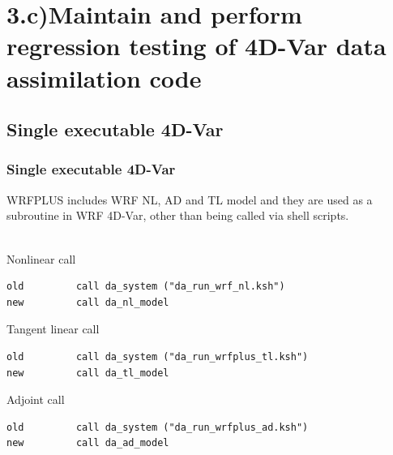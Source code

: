 \documentclass{beamer}
\begin{document}
\section{3.c)Maintain and perform regression testing of 4D-Var data assimilation code}

\subsection{Single executable 4D-Var}
\begin{frame}[fragile]
\frametitle{Single executable 4D-Var}
WRFPLUS includes WRF NL, AD and TL model and they are used as a subroutine in WRF 4D-Var, other than being called via shell scripts.
~\\
~\\
\begin{beamerboxesrounded}[ lower=postit,shadow=true]{Nonlinear call}
\begin{verbatim}
old         call da_system ("da_run_wrf_nl.ksh")
new         call da_nl_model
\end{verbatim}
\end{beamerboxesrounded}
\begin{beamerboxesrounded}[ lower=postit,shadow=true]{Tangent linear call}
\begin{verbatim}
old         call da_system ("da_run_wrfplus_tl.ksh")
new         call da_tl_model
\end{verbatim}
\end{beamerboxesrounded}
\begin{beamerboxesrounded}[ lower=postit,shadow=true]{Adjoint call}
\begin{verbatim}
old         call da_system ("da_run_wrfplus_ad.ksh")
new         call da_ad_model
\end{verbatim}
\end{beamerboxesrounded}
\end{frame}
\end{document}
